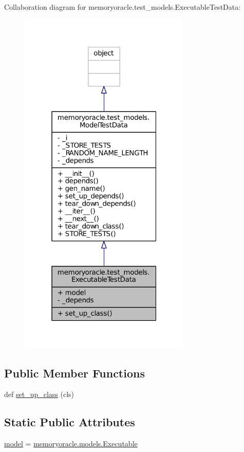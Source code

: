 Collaboration diagram for memoryoracle.\+test\+\_\+models.\+Executable\+Test\+Data\+:\nopagebreak
\begin{figure}[H]
\begin{center}
\leavevmode
\includegraphics[width=232pt]{classmemoryoracle_1_1test__models_1_1ExecutableTestData__coll__graph}
\end{center}
\end{figure}
\subsection*{Public Member Functions}
\begin{DoxyCompactItemize}
\item 
def \hyperlink{classmemoryoracle_1_1test__models_1_1ExecutableTestData_a526f912c2e8eeddb64beb6241f138c09}{set\+\_\+up\+\_\+class} (cls)
\end{DoxyCompactItemize}
\subsection*{Static Public Attributes}
\begin{DoxyCompactItemize}
\item 
\hyperlink{classmemoryoracle_1_1test__models_1_1ExecutableTestData_a81ed1592e6042c61fe80728b55275bdc}{model} = \hyperlink{classmemoryoracle_1_1models_1_1Executable}{memoryoracle.\+models.\+Executable}
\end{DoxyCompactItemize}
